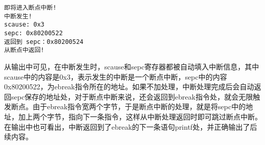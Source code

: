 \begin{minipage}[c]{0.95\textwidth}
\begin{lstlisting}[caption={断点中断测试输出}, label={lst:interrupttestres}]
即将进入断点中断!
中断发生!
scause: 0x3
sepc: 0x80200522
返回到 sepc：0x80200524
从断点中返回!
\end{lstlisting}
\end{minipage}

从输出中可见，在中断发生时，scause和sepc寄存器都被自动填入中断信息，其中scause中的内容是0x3，表示发生的中断是一个断点中断，sepc中的内容0x80200522，为ebreak指令所在的地址。如果不加处理，中断处理完成后会自动返回sepc保存的地址处，对于断点中断来说，还会返回到ebreak指令处，就会无限触发断点。由于ebreak指令宽两个字节，于是断点中断的处理，就是将sepc中的地址，加上两个字节，指向下一条指令，这样从中断处理返回时即可跳过断点中断。在输出中也可看出，中断返回到了ebreak的下一条语句printf处，并正确输出了后续内容。